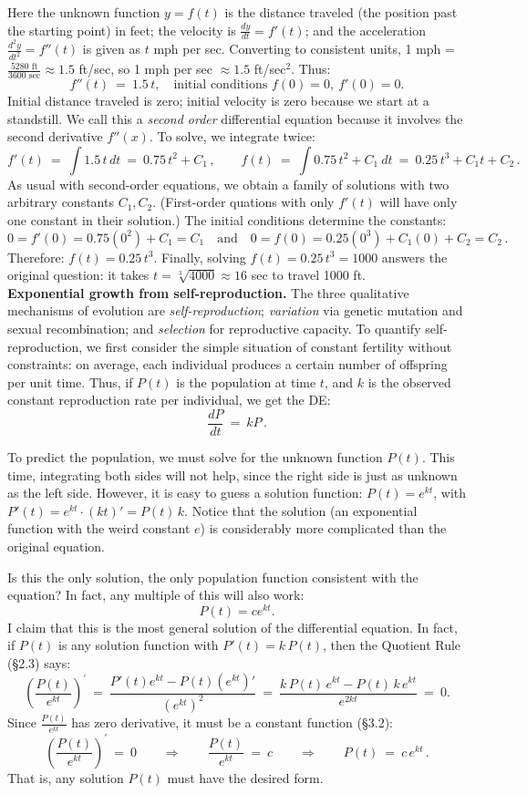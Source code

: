 \documentclass[11pt]{article}
\begin{document}
Here the unknown function $y=f(t)$ is the distance traveled (the position past the starting point) in feet; the velocity is $\frac{dy}{dt}=f'(t)$; and the acceleration $\frac{d^2\!y}{dt^2}=f''(t)$ is given as $t$ mph per sec.
Converting to consistent units, 1 mph =  $\frac{5280 \text{ ft}}{3600\text{ sec}}\approx 1.5$ ft/sec, so 1 mph per sec $\approx 1.5 $ ft/sec$^2$. Thus:
$$
f''(t) \ =\ 1.5\, t,\quad
\text{initial conditions }
f(0)  =  0, \ f'(0) = 0.
$$
Initial distance traveled is zero; initial velocity is zero because we start at a standstill.
We call this a {\it second order} differential equation because it involves 
the second derivative $f''(x)$. 
To solve, we integrate twice:
$$
f'(t) \ =\ \int 1.5\, t\,dt \ =\ 0.75\, t^2 + C_1\,,
\qquad
f(t) \ =\ \int 0.75\, t^2 + C_1\ dt 
\ =\  0.25\, t^3 + C_1t + C_2\,.
$$ 
As usual with second-order equations,
 we obtain a family of solutions with two arbitrary constants  $C_1, C_2$.
(First-order quations with only $f'(t)$ will have only one constant 
in their solution.)
The initial conditions determine the constants: $$0=f'(0)=0.75 (0^2) + C_1=C_1
\quad\text{and}\quad
0=f(0)=0.25 (0^3) + C_1(0) + C_2=C_2\,.
$$
Therefore: $f(t) = 0.25\, t^3$. 
Finally, solving $f(t) = 0.25\, t^3=1000$ answers the original question: 
it takes $t=\sqrt[3]{4000}\approx 16$ sec to travel 1000 ft.
\\[.5em]
{\bf Exponential growth from self-reproduction.} The three qualitative mechanisms
of evolution are {\it self-reproduction}; 
{\it variation} via genetic mutation and sexual recombination; 
and {\it selection} for reproductive capacity. 
To quantify self-reproduction, we first consider the simple situation 
of constant fertility without constraints: on average, each individual produces 
a certain number of offspring per unit time. 
Thus, if $P(t)$ is the population at time $t$, and 
$k$ is the observed constant reproduction rate per individual, 
we get the DE:
$$
\frac{dP}{dt} \ =\ kP\,.
$$

To predict the population, we must solve for the unknown function $P(t)$.
This time, integrating both sides will not help, since the right side 
is just as unknown as the left side. 
However, it is easy to guess a solution function: $P(t)=e^{kt}$, with $P'(t)=e^{kt}\cdot(kt)'
= P(t)\, k$. Notice that the solution (an exponential function with the weird constant $e$) is considerably more complicated than the original equation.

Is this the only solution, the only population function consistent with the equation?
In fact, any multiple of this will also work:
$$P(t)=c e^{kt}.$$
I claim that this is the most general solution of the differential equation.
In fact, if $P(t)$ is any solution function with $P'(t)= k\,P(t)$, then the Quotient Rule (\S2.3) says:
$$
\left(\frac{P(t)}{e^{kt}}\right)^{\!\prime}
\ =\ 
\frac{ P'(t) e^{kt}-P(t) (e^{kt})'}{(e^{kt})^2}
\ =\ 
\frac{k\, P(t)\, e^{kt}-P(t) \,k\,e^{kt}}{e^{2kt}}
\ =\  0.
$$
Since $\frac{P(t)}{e^{kt}}$ has zero derivative, it must be a constant function 
(\S3.2):
$$
\left(\frac{P(t)}{e^{kt}}\right)^{\!\prime} \ =\ 0
\qquad\Longrightarrow\qquad
\frac{P(t)}{e^{kt}} \ =\ c
\qquad\Longrightarrow\qquad
P(t) \ =\ c\, e^{kt}\,.
$$
That is, any solution $P(t)$ must have the desired form.
\end{document}
